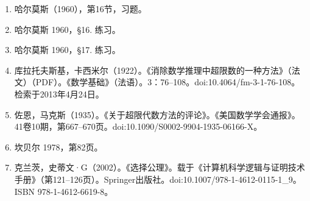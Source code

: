\begin{enumerate}
\item 哈尔莫斯（1960），第16节，习题。
\item 哈尔莫斯 1960，§16. 练习。
\item 哈尔莫斯 1960，§17. 练习。
\item 库拉托夫斯基，卡西米尔（1922）。《消除数学推理中超限数的一种方法》（法文）（PDF）。《数学基础》（法语）。3：76–108。doi:10.4064/fm-3-1-76-108。检索于2013年4月24日。
\item 佐恩，马克斯（1935）。《关于超限代数方法的评论》。《美国数学学会通报》。41卷10期，第667–670页。doi:10.1090/S0002-9904-1935-06166-X。
\item 坎贝尔 1978，第82页。
\item 克兰茨，史蒂文·G（2002）。《选择公理》。载于《计算机科学逻辑与证明技术手册》（第121–126页）。Springer出版社。doi:10.1007/978-1-4612-0115-1_9。ISBN 978-1-4612-6619-8。
\end{enumerate}